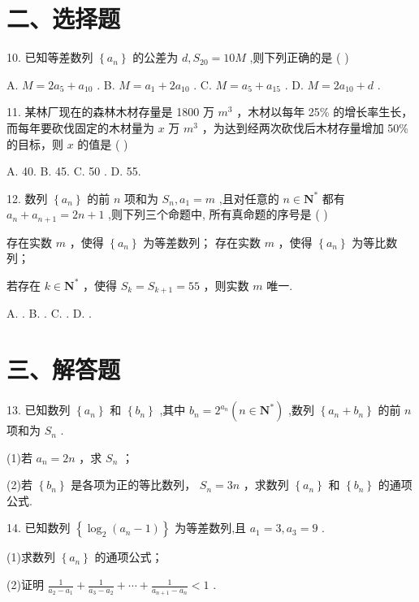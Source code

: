 \section*{二、选择题}

10. 已知等差数列 $\left\{  {a}_{n}\right\}$ 的公差为 $d,{S}_{20} = {10M}$ ,则下列正确的是 ( )

A. $M = 2{a}_{5} + {a}_{10}$ . B. $M = {a}_{1} + 2{a}_{10}$ . C. $M = {a}_{5} + {a}_{15}$ . D. $M = 2{a}_{10} + d$ .

11. 某林厂现在的森林木材存量是 1800 万 ${{m}}^{3}$ ，木材以每年 25\% 的增长率生长，而每年要砍伐固定的木材量为 $x$ 万 ${{m}}^{3}$ ，为达到经两次砍伐后木材存量增加 50\% 的目标，则 $x$ 的值是 ( )

A. 40. B. 45. C. 50 . D. 55.

12. 数列 $\left\{  {a}_{n}\right\}$ 的前 $n$ 项和为 ${S}_{n},{a}_{1} = m$ ,且对任意的 $n \in  {\mathbf{N}}^{ * }$ 都有 ${a}_{n} + {a}_{n + 1} = {2n} + 1$ ,则下列三个命题中, 所有真命题的序号是 ( )

   存在实数 $m$ ，使得 $\left\{  {a}_{n}\right\}$ 为等差数列；   存在实数 $m$ ，使得 $\left\{  {a}_{n}\right\}$ 为等比数列；

  若存在 $k \in  {\mathbf{N}}^{ * }$ ，使得 ${S}_{k} = {S}_{k + 1} = {55}$ ，则实数 $m$ 唯一.

A.   . B.     . C.     . D.       .

\section*{三、解答题}

13. 已知数列 $\left\{  {a}_{n}\right\}$ 和 $\left\{  {b}_{n}\right\}$ ,其中 ${b}_{n} = {2}^{{a}_{n}}\left( {n \in  {\mathbf{N}}^{ * }}\right)$ ,数列 $\left\{  {{a}_{n} + {b}_{n}}\right\}$ 的前 $n$ 项和为 ${S}_{n}$ .

(1)若 ${a}_{n} = {2n}$ ，求 ${S}_{n}$ ；

(2)若 $\left\{  {b}_{n}\right\}$ 是各项为正的等比数列， ${S}_{n} = {3n}$ ，求数列 $\left\{  {a}_{n}\right\}$ 和 $\left\{  {b}_{n}\right\}$ 的通项公式.

14. 已知数列 $\left\{  {{\log }_{2}\left( {{a}_{n} - 1}\right) }\right\}$ 为等差数列,且 ${a}_{1} = 3,{a}_{3} = 9$ .

(1)求数列 $\left\{  {a}_{n}\right\}$ 的通项公式；

(2)证明 $\frac{1}{{a}_{2} - {a}_{1}} + \frac{1}{{a}_{3} - {a}_{2}} + \cdots  + \frac{1}{{a}_{n + 1} - {a}_{n}} < 1$ .

